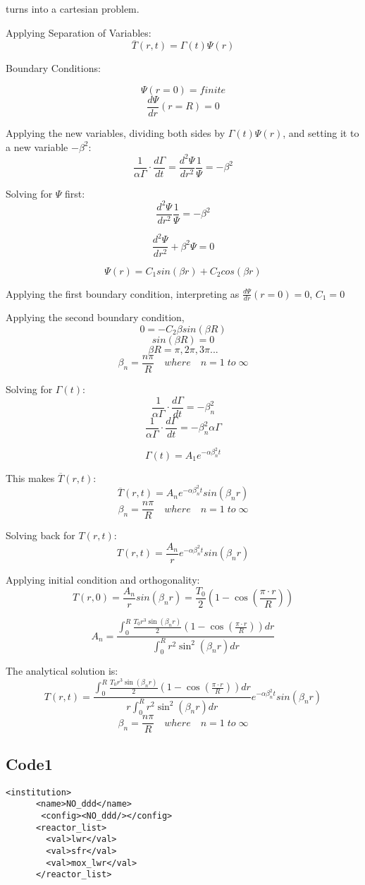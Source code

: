 \documentclass[12pt,letterpaper]{article}
\begin{document}
turns into a cartesian problem.

Applying Separation of Variables:
\[\overline{T}(r,t) = \Gamma (t) \Psi (r)  \]

Boundary Conditions:

\[\Psi(r = 0) = finite \]
\[\frac{d\Psi}{dr} (r = R) = 0 \]

Applying the new variables, dividing both sides by $\Gamma (t) \Psi (r) $,
and setting it to a new variable $ -\beta^2 $:
\[\frac{1}{\alpha  \Gamma} \cdot \frac{d\Gamma}{dt} = \frac{d^2 \Psi}{dr^2} \frac{1}{\Psi} = -\beta^2 \] 

Solving for $\Psi$ first:
\[\frac{d^2 \Psi}{dr^2} \frac{1}{\Psi} = -\beta^2 \]

\[\frac{d^2 \Psi}{dr^2} + \beta^2 \Psi = 0 \]

\[\Psi (r) = C_1 sin(\beta r) + C_2 cos(\beta r) \]

Applying the first boundary condition,
interpreting as $\frac{d\Psi}{dr} (r = 0) = 0$, $C_1 = 0 $

Applying the second boundary condition,
\[0 =  -C_2 \beta sin(\beta R) \]
\[sin(\beta R) = 0  \]
\[\beta R = \pi, 2\pi, 3\pi ... \]
\[\beta_n = \frac{n\pi}{R} \quad where \quad n = 1 \; to \; \infty \]

Solving for $\Gamma(t)$:
\[\frac{1}{\alpha  \Gamma} \cdot \frac{d\Gamma}{dt} = -\beta_n^2 \]
\[\frac{1}{\alpha  \Gamma} \cdot \frac{d\Gamma}{dt} = -\beta_n^2 \alpha \Gamma \]

\[\Gamma(t) = A_1 e^{-\alpha \beta_n^2 t }\]

This makes $\overline{T}(r,t)$:
\[\overline{T}(r,t) = A_n e^{-\alpha \beta_n^2 t} sin(\beta_n r)\]
\[\beta_n = \frac{n\pi}{R} \quad where \quad n = 1 \; to \; \infty \]

Solving back for $T(r,t)$:
\[T(r,t) = \frac{A_n}{r} e^{-\alpha \beta_n^2 t} sin(\beta_n r)\]

Applying initial condition and orthogonality:
\[T(r,0) = \frac{A_n}{r} sin(\beta_n r) = \frac{T_0}{2} (1-\cos{(\frac{\pi \cdot r}{R})}) \]

\[A_n = \frac{\int_{0}^{R} \frac{T_0 r^3 \sin(\beta_n r)}{2} (1-\cos{(\frac{\pi \cdot r}{R})}) dr}{\int_{0}^{R} r^2 \sin^{2}(\beta_n r) dr}\]

The analytical solution is:
\[T(r,t) = \frac{\int_{0}^{R} \frac{T_0 r^3 \sin(\beta_n r)}{2} (1-\cos{(\frac{\pi \cdot r}{R})}) dr}{r \int_{0}^{R} r^2 \sin^{2}(\beta_n r) dr} e^{-\alpha \beta_n^2 t} sin(\beta_n r)\]
\[\beta_n = \frac{n\pi}{R} \quad where \quad n = 1 \; to \; \infty \]

\subsection{Code1}
\begin{verbatim}
<institution>
      <name>NO_ddd</name>
       <config><NO_ddd/></config>
      <reactor_list>
        <val>lwr</val>
        <val>sfr</val>
        <val>mox_lwr</val>
      </reactor_list>
\end{verbatim}
\end{document}

